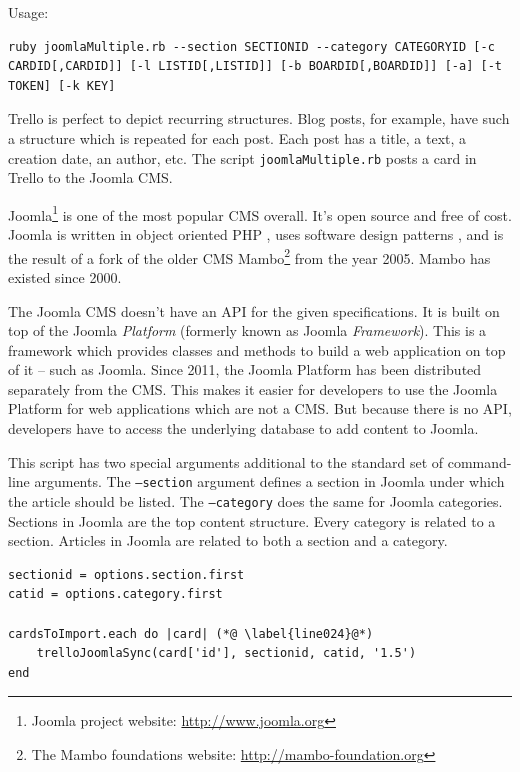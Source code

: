 Usage:
\begin{lstlisting}[aboveskip=1\baselineskip, style=bash, caption=\texttt{joomlaMultiple.rb} usage., label=listing028]
ruby joomlaMultiple.rb --section SECTIONID --category CATEGORYID [-c CARDID[,CARDID]] [-l LISTID[,LISTID]] [-b BOARDID[,BOARDID]] [-a] [-t TOKEN] [-k KEY]
\end{lstlisting}

Trello is perfect to depict recurring structures. Blog posts, for example, have such a structure which is repeated for each post. Each post has a title, a text, a creation date, an author, etc. The script \texttt{joomlaMultiple.rb} posts a card in Trello to the Joomla CMS.

Joomla\footnote{Joomla project website: \url{http://www.joomla.org}} is one of the most popular CMS  overall. It's open source and free of cost. Joomla is written in object oriented PHP \cite{joomla:architecture}, uses software design patterns \cite{joomla:mvc}, and is the result of a fork of the older CMS Mambo\footnote{The Mambo foundations website: \url{http://mambo-foundation.org}} from the year 2005. Mambo has existed since 2000.

The Joomla CMS doesn't have an API for the given specifications. It is built on top of the Joomla \emph{Platform} (formerly known as Joomla \emph{Framework}). This is a framework which provides classes and methods to build a web application on top of it – such as Joomla. Since 2011, the Joomla Platform has been distributed separately from the CMS. This makes it easier for developers to use the Joomla Platform for web applications which are not a CMS. \cite{joomla:api} But because there is no API, developers have to access the underlying database to add content to Joomla.

This script has two special arguments additional to the standard set of command-line arguments. The \texttt{--section} argument defines a section in Joomla under which the article should be listed. The \texttt{--category} does the same for Joomla categories. Sections in Joomla are the top content structure. Every category is related to a section. Articles in Joomla are related to both a section and a category.

\begin{lstlisting}[aboveskip=1\baselineskip, caption=Passing the needed information to the trelloJoomlaSync() method., label=listing028]
sectionid = options.section.first
catid = options.category.first

cardsToImport.each do |card| (*@ \label{line024}@*)
	trelloJoomlaSync(card['id'], sectionid, catid, '1.5')
end
\end{lstlisting}

